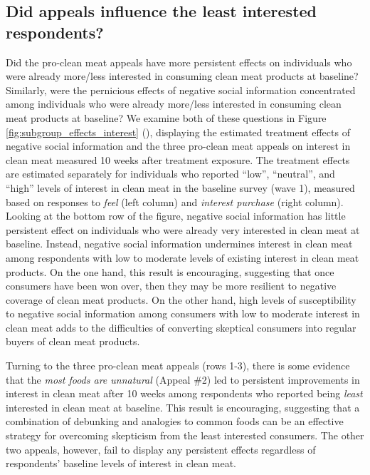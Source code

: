 \documentclass[12pt]{article}
\newcommand{\todo}[1]{\textit{\textcolor{red}{$<$todo$>$ #1 $<$/todo$>$}}}
\begin{document}




\subsection{Did appeals influence the least interested respondents?}

Did the pro-clean meat appeals have more persistent effects on individuals who were already more/less interested in consuming clean meat products at baseline? Similarly, were the pernicious effects of negative social information concentrated among individuals who were already more/less interested in consuming clean meat products at baseline? We examine both of these questions in Figure \ref{fig:subgroup_effects_interest} (), displaying the estimated treatment effects of negative social information and the three pro-clean meat appeals on interest in clean meat measured 10 weeks after treatment exposure. The treatment effects are estimated separately for individuals who reported ``low'', ``neutral'', and ``high'' levels of interest in clean meat in the baseline survey (wave 1), measured based on responses to \textit{feel} (left column) and \textit{interest purchase} (right column). Looking at the bottom row of the figure, negative social information has little persistent effect on individuals who were already very interested in clean meat at baseline. Instead, negative social information undermines interest in clean meat among respondents with low to moderate levels of existing interest in clean meat products. On the one hand, this result is encouraging, suggesting that once consumers have been won over, then they may be more resilient to negative coverage of clean meat products. On the other hand, high levels of susceptibility to negative social information among consumers with low to moderate interest in clean meat adds to the difficulties of converting skeptical consumers into regular buyers of clean meat products.

Turning to the three pro-clean meat appeals (rows 1-3), there is some evidence that the \textit{most foods are unnatural} (Appeal \#2) led to persistent improvements in interest in clean meat after 10 weeks among respondents who reported being \textit{least} interested in clean meat at baseline. This result is encouraging, suggesting that a combination of debunking and analogies to common foods can be an effective strategy for overcoming skepticism from the least interested consumers. The other two appeals, however, fail to display any persistent effects regardless of respondents' baseline levels of interest in clean meat.
\end{document}
